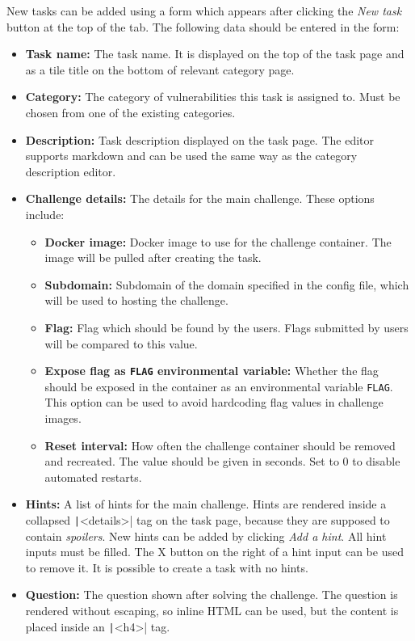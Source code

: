 New tasks can be added using a form which appears after clicking the \textit{New task} button at the top of the tab. The following data should be entered in the form:

\begin{itemize}
    \item \textbf{Task name:} The task name. It is displayed on the top of the task page and as a tile title on the bottom of relevant category page.
    \item \textbf{Category:} The category of vulnerabilities this task is assigned to. Must be chosen from one of the existing categories.
    \item \textbf{Description:} Task description displayed on the task page. The editor supports markdown and can be used the same way as the category description editor.
    \item \textbf{Challenge details:} The details for the main challenge. These options include:
    \begin{itemize}
        \item \textbf{Docker image:} Docker image to use for the challenge container. The image will be pulled after creating the task.
        \item \textbf{Subdomain:} Subdomain of the domain specified in the config file, which will be used to hosting the challenge.
        \item \textbf{Flag:} Flag which should be found by the users. Flags submitted by users will be compared to this value.
        \item \textbf{Expose flag as \texttt{FLAG} environmental variable:} Whether the flag should be exposed in the container as an environmental variable \texttt{FLAG}. This option can be used to avoid hardcoding flag values in challenge images.
        \item \textbf{Reset interval:} How often the challenge container should be removed and recreated. The value should be given in seconds. Set to 0 to disable automated restarts.
    \end{itemize}
    \item \textbf{Hints:} A list of hints for the main challenge. Hints are rendered inside a collapsed \texttt|<details>| tag on the task page, because they are supposed to contain \textit{spoilers}. New hints can be added by clicking \textit{Add a hint}. All hint inputs must be filled. The X button on the right of a hint input can be used to remove it. It is possible to create a task with no hints.
    \item \textbf{Question:} The question shown after solving the challenge. The question is rendered without escaping, so inline HTML can be used, but the content is placed inside an \texttt|<h4>| tag.

\end{itemize}

